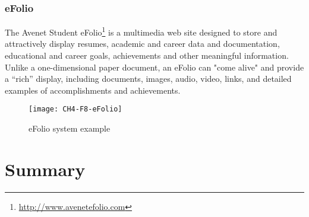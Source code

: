 \subsubsection{eFolio}

The Avenet Student eFolio\footnote{\url{http://www.avenetefolio.com}} is a
multimedia web site designed to store and attractively display resumes, academic
and career data and documentation, educational and career goals, achievements
and other meaningful information. Unlike a one-dimensional paper document, an
eFolio can "come alive" and provide a ``rich'' display, including documents,
images, audio, video, links, and detailed examples of accomplishments and
achievements.

\begin{figure}[htb]
\centering
\setlength\fboxsep{0pt}
\setlength\fboxrule{0.5pt}
\texttt{[image: CH4-F8-eFolio]}
\caption[eFolio system example]{eFolio system example \citep{EFolioMinnesota2011}}
\label{fig:efolio}
\end{figure}

\section{Summary}